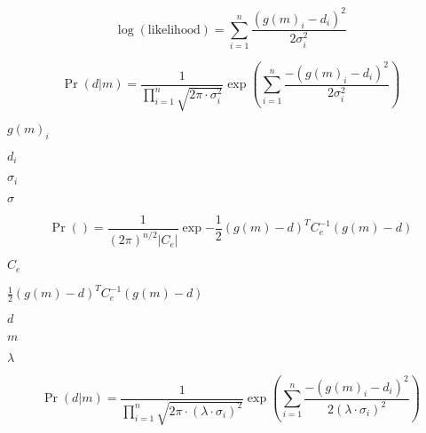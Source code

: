 \documentclass{article}
\begin{document}
\[ \log({\mathrm{likelihood}}) = \sum_{i = 1}^n \frac{\left(g\left(m\right)_i - d_i\right)^2}{2 \sigma_i^2} \]
\pagebreak

\[ \Pr(d|m) = \frac{1}{\prod_{i=1}^n \sqrt{2 \pi \cdot \sigma_i^2}} \exp{\left( \sum_{i = 1}^n \frac{-\left(g\left(m\right)_i - d_i\right)^2}{2\sigma_i^2}\right)} \]
\pagebreak

$g(m)_i$
\pagebreak

$d_i$
\pagebreak

$\sigma_i$
\pagebreak

$\sigma$
\pagebreak

\[ \Pr() = \frac{1}{(2 \pi)^{n/2} |C_e|} \exp{-\frac{1}{2}(g(m) - d)^T C_e^{-1} (g(m) - d)} \]
\pagebreak

$ C_e $
\pagebreak

$\frac{1}{2}(g(m) - d)^T C_e^{-1} (g(m) - d)$
\pagebreak

$d$
\pagebreak

$m$
\pagebreak

$\lambda$
\pagebreak

\[ \Pr(d|m) = \frac{1}{\prod_{i=1}^n \sqrt{2 \pi \cdot (\lambda \cdot \sigma_i)^2}} \exp{\left( \sum_{i = 1}^n \frac{-\left(g\left(m\right)_i - d_i\right)^2}{2(\lambda \cdot \sigma_i)^2}\right)} \]
\pagebreak
\end{document}

